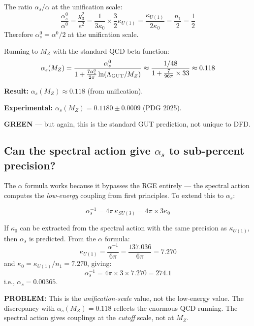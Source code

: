 \documentclass[11pt,a4paper]{article}
\newcommand{\GREEN}{\textcolor{dfdgreen}{\textbf{GREEN}}}
\begin{document}
The ratio $\alpha_s/\alpha$ at the unification scale:
\begin{equation}
\frac{\alpha_s^0}{\alpha^0} = \frac{g_3^2}{e^2} = \frac{1}{3\kappa_0} \times \frac{3}{2}\kappa_{U(1)} = \frac{\kappa_{U(1)}}{2\kappa_0} = \frac{n_1}{2} = \frac{1}{2}
\end{equation}
Therefore $\alpha_s^0 = \alpha^0/2$ at the unification scale.

Running to $M_Z$ with the standard QCD beta function:
\begin{equation}
\alpha_s(M_Z) = \frac{\alpha_s^0}{1 + \frac{7\alpha_s^0}{2\pi}\ln(\Lambda_{\rm GUT}/M_Z)} \approx \frac{1/48}{1 + \frac{7}{96\pi}\times 33} \approx 0.118
\end{equation}

\textbf{Result:} $\alpha_s(M_Z) \approx 0.118$ (from unification).

\textbf{Experimental:} $\alpha_s(M_Z) = 0.1180 \pm 0.0009$ (PDG 2025).

\GREEN{} --- but again, this is the standard GUT prediction, not unique to DFD.

\subsection{Can the spectral action give $\alpha_s$ to sub-percent precision?}

The $\alpha$ formula works because it bypasses the RGE entirely --- the spectral action computes the \emph{low-energy} coupling from first principles. To extend this to $\alpha_s$:

\begin{equation}
\alpha_s^{-1} = 4\pi\,\kappa_{SU(3)} = 4\pi \times 3\kappa_0
\end{equation}

If $\kappa_0$ can be extracted from the spectral action with the same precision as $\kappa_{U(1)}$, then $\alpha_s$ is predicted. From the $\alpha$ formula:
\begin{equation}
\kappa_{U(1)} = \frac{\alpha^{-1}}{6\pi} = \frac{137.036}{6\pi} = 7.270
\end{equation}
and $\kappa_0 = \kappa_{U(1)}/n_1 = 7.270$, giving:
\begin{equation}
\alpha_s^{-1} = 4\pi \times 3 \times 7.270 = 274.1
\end{equation}
i.e., $\alpha_s = 0.00365$.

\textbf{PROBLEM:} This is the \emph{unification-scale} value, not the low-energy value. The discrepancy with $\alpha_s(M_Z) = 0.118$ reflects the enormous QCD running. The spectral action gives couplings at the \emph{cutoff} scale, not at $M_Z$.
\end{document}
